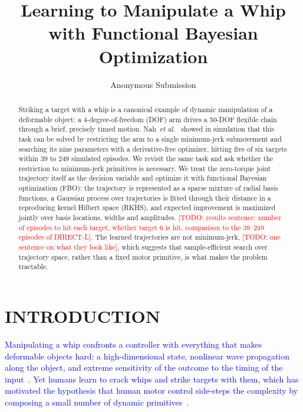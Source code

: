 \documentclass[letterpaper, 10 pt, conference]{ieeeconf}
\title{\LARGE \bf
Learning to Manipulate a Whip with Functional Bayesian Optimization
}
\author{Anonymous Submission}
\newcommand{\todo}[1]{\textcolor{red}{[TODO: #1]}}
\newcommand{\draft}[1]{\textcolor{blue}{#1}}
\begin{document}
\maketitle
\thispagestyle{empty}
\pagestyle{empty}

\begin{abstract}
Striking a target with a whip is a canonical example of dynamic manipulation of
a deformable object: a 4-degree-of-freedom (DOF) arm drives a 50-DOF flexible
chain through a brief, precisely timed motion. Nah~\emph{et al.}~\cite{nah2023whip}
showed in simulation that this task can be solved by restricting the arm to a
single minimum-jerk submovement and searching its nine parameters with a
derivative-free optimizer, hitting five of six targets within 39 to 249
simulated episodes. We revisit the same task and ask whether the restriction to
minimum-jerk primitives is necessary. We treat the zero-torque joint trajectory
itself as the decision variable and optimize it with functional Bayesian
optimization (FBO): the trajectory is represented as a sparse mixture of
radial basis functions, a Gaussian process over trajectories is fitted through
their distance in a reproducing kernel Hilbert space (RKHS), and expected
improvement is maximized jointly over basis locations, widths and amplitudes.
\todo{results sentence: number of episodes to hit each target, whether target 6
is hit, comparison to the 39--249 episodes of DIRECT-L}. The learned
trajectories are not minimum-jerk, \todo{one sentence on what they look like},
which suggests that sample-efficient search over trajectory space, rather than
a fixed motor primitive, is what makes the problem tractable.
\end{abstract}

\section{INTRODUCTION}

\draft{
Manipulating a whip confronts a controller with everything that makes
deformable objects hard: a high-dimensional state, nonlinear wave propagation
along the object, and extreme sensitivity of the outcome to the timing of the
input~\cite{krotov2022whip,nah2023whip}. Yet humans learn to crack whips and
strike targets with them, which has motivated the hypothesis that human motor
control side-steps the complexity by composing a small number of dynamic
primitives~\cite{hogan2012primitives,flash1985minjerk}.
}
\end{document}
